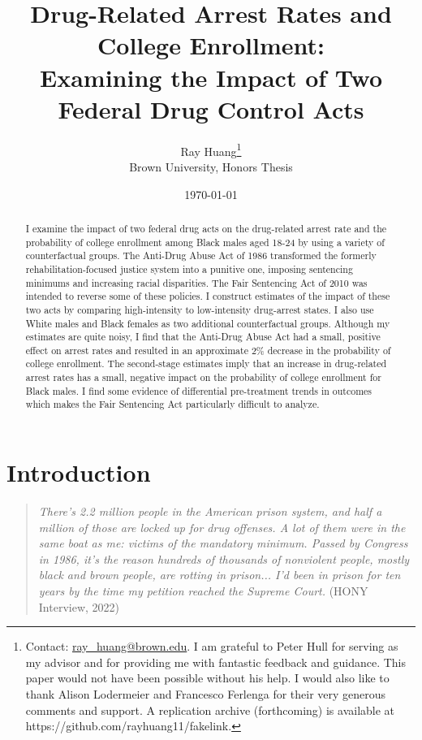 \documentclass{article}
\title{Drug-Related Arrest Rates and College Enrollment:
\texorpdfstring{\\}{} Examining the Impact of Two Federal Drug Control Acts}
\author{Ray Huang\thanks{Contact:
    \href{mailto:ray_huang@brown.edu}{ray\_huang@brown.edu}.
     I am grateful to Peter Hull for serving as my advisor and for providing me with fantastic feedback and guidance. This paper would not have been possible without his help. I would also like to thank Alison Lodermeier and Francesco Ferlenga for their very generous comments and support. A replication archive (forthcoming) is available at https://github.com/rayhuang11/fakelink.}
     \\Brown University, Honors Thesis}
\date{\today}
\begin{document}
\maketitle

\begin{abstract}
\noindent I examine the impact of two federal drug acts on the drug-related arrest rate and the probability of college enrollment among Black males aged 18-24 by using a variety of counterfactual groups. The Anti-Drug Abuse Act of 1986 transformed the formerly rehabilitation-focused justice system into a punitive one, imposing sentencing minimums and increasing racial disparities. The Fair Sentencing Act of 2010 was intended to reverse some of these policies. I construct estimates of the impact of these two acts by comparing high-intensity to low-intensity drug-arrest states. I also use White males and Black females as two additional counterfactual groups. Although my estimates are quite noisy, I find that the Anti-Drug Abuse Act had a small, positive effect on arrest rates and resulted in an approximate 2\% decrease in the probability of college enrollment. The second-stage estimates imply that an increase in drug-related arrest rates has a small, negative impact on the probability of college enrollment for Black males. I find some evidence of differential pre-treatment trends in outcomes which makes the Fair Sentencing Act particularly difficult to analyze.
\end{abstract}

\clearpage

\section{Introduction}
 

\begin{quote}
  \textit{There’s 2.2 million people in the American prison system, and half a million of those are locked up for drug offenses. A lot of them were in the same boat as me: victims of the mandatory minimum. Passed by Congress in 1986, it’s the reason hundreds of thousands of nonviolent people, mostly black and brown people, are rotting in prison... I’d been in prison for ten years by the time my petition reached the Supreme Court.}
  \hspace*{\fill} (HONY Interview, 2022)
\end{quote}
\end{document}
